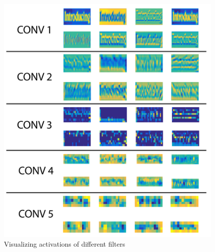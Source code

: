 \documentclass[10pt,twocolumn,letterpaper]{article}
\begin{document}
\begin{figure}
\includegraphics[width=\columnwidth]{Figures/activation_vis/activation_vis-01.png}
\caption{Visualizing activations of different filters}
\label{fig:deepvis}
\end{figure}
\end{document}
